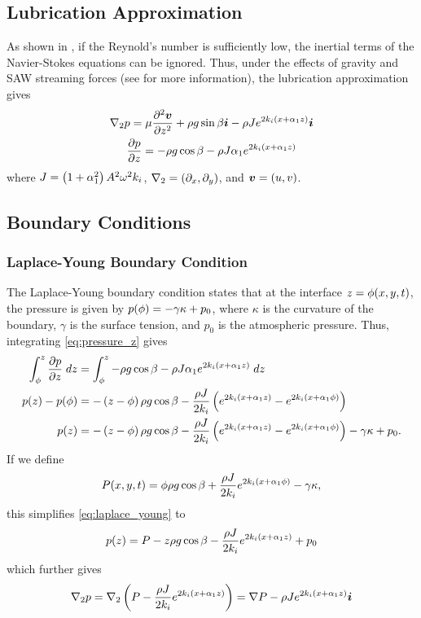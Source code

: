 
\subsection{Lubrication Approximation}
As shown in \cite{kondic2003instabilities}, if the Reynold's number is sufficiently low, the inertial terms of the Navier-Stokes equations 
can be ignored. Thus, under the effects of gravity and SAW streaming forces (see \cite{shiokawa1994saw} for more information), the lubrication approximation gives
\begin{gather}
    \nabla_2 p = \mu \frac{\partial^2 \boldsymbol{v}}{\partial z^2} + \rho g \sin\beta \boldsymbol{i} - \rho Je^{2k_i \left( x + \alpha_1 z \right)}\boldsymbol{i}
    \label{eq:pressure_grad}\\
    \frac{\partial p}{\partial z} = -\rho g \cos\beta - \rho J\alpha_1 e^{2k_i \left( x + \alpha_1 z \right)}
    \label{eq:pressure_z}
\end{gather}
where $J = \left( 1 + \alpha_1^2 \right)A^2\omega^2k_i$,  $\nabla_2 = \left( \partial_x, \partial_y \right)$, 
and $\boldsymbol{v} = \left( u, v \right)$. 

\subsection{Boundary Conditions}
\subsubsection{Laplace-Young Boundary Condition}
The Laplace-Young boundary condition states that at the interface $z = \phi\!\left( x, y, t \right)$, the pressure is given by 
$p\!\left( \phi \right) = -\gamma \kappa + p_0$, where $\kappa$ is the curvature of the boundary, $\gamma$ is the surface tension, and $p_0$ is the atmospheric pressure. 
Thus, integrating \cref{eq:pressure_z} gives 
\begin{align}
    \nonumber \int_{\phi}^{z} \frac{\partial p}{\partial z} \; dz &=  \int_{\phi}^{z} -\rho g \cos \beta - \rho J\alpha_1 e^{2k_i \left( x + \alpha_1 z \right)} \; dz\\
    \nonumber p\!\left( z \right) - p\!\left( \phi \right) &= -\left( z - \phi \right) \rho g \cos \beta - \frac{\rho J}{2k_i} \left( e^{2k_i \left( x + \alpha_1 z \right)} - e^{2k_i \left( x + \alpha_1 \phi \right)} \right)\\
    p\!\left( z \right) &= -\left( z - \phi \right)\rho g \cos \beta - \frac{\rho J}{2k_i} \left( e^{2k_i \left( x + \alpha_1 z \right)} - e^{2k_i \left( x + \alpha_1 \phi \right)} \right) -\gamma \kappa + p_0.  
    \label{eq:laplace_young}
\end{align}
If we define 
\begin{align}
    P\!\left( x, y, t \right) = \phi \rho g \cos\beta + \frac{\rho J}{2k_i} e^{2k_i \left( x + \alpha_1 \phi \right)} - \gamma\kappa, 
    \label{eq:cap_P}
\end{align}
this simplifies \cref{eq:laplace_young} to 
\begin{align*}
    p\!\left( z \right) = P - z\rho g \cos\beta - \frac{\rho J}{2k_i}e^{2k_i \left( x + \alpha_1 z \right)} + p_0
\end{align*}
which further gives 
\begin{align}
    \grad_2 p %
    = \grad_2 \lrp{P - \frac{\rho J}{2k_i}\cexpz}
    = \grad P - \rho J\cexpz \vect{i}
    \label{eq:grad2_p_expanded}
\end{align}

